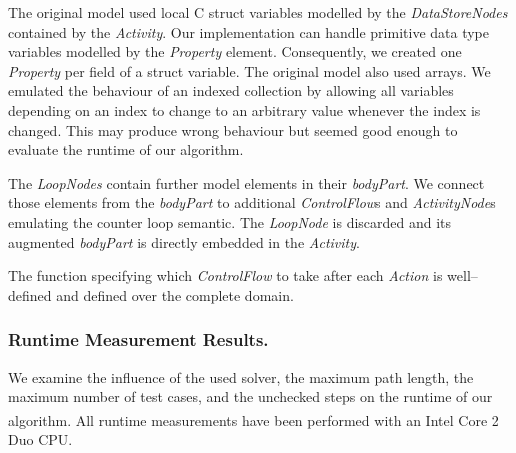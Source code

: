 \documentclass[runningheads,a4paper]{llncs}%
\newcommand{\UMLType}[1]{\textsf{\textit{#1}}} %
\newcommand{\UMLReference}[1]{\textsf{\textit{#1}}} %
\begin{document}
The original model used local C struct variables modelled by the
\UMLType{DataStoreNodes} contained by the \UMLType{Activity}. Our implementation
can handle primitive data type variables modelled by the \UMLType{Property}
element. Consequently, we created one \UMLType{Property} per field of a struct
variable. The original model also used arrays. We emulated the behaviour of an
indexed collection by allowing all variables depending on an index to change to
an arbitrary value whenever the index is changed. This may produce wrong
behaviour but seemed good enough to evaluate the runtime of our algorithm.

The \UMLType{LoopNodes} contain further model elements in their
\UMLReference{bodyPart}. We connect those elements from the
\UMLReference{bodyPart} to additional \UMLType{ControlFlow}s and
\UMLType{ActivityNode}s emulating the counter loop semantic. The
\UMLType{LoopNode} is discarded and its augmented \UMLReference{bodyPart} is
directly embedded in the \UMLType{Activity}.

The function specifying which \UMLType{ControlFlow} to take after each
\UMLType{Action} is well--defined and defined over the complete domain.
\subsubsection{Runtime Measurement Results.}
We examine the influence of the used solver, the maximum path length, the
maximum number of test cases, and the unchecked steps on the runtime of our
algorithm. All runtime measurements have been performed with an
Intel\textsuperscript{\textregistered} Core\textsuperscript{\texttrademark} 2
Duo CPU.%
\end{document}
